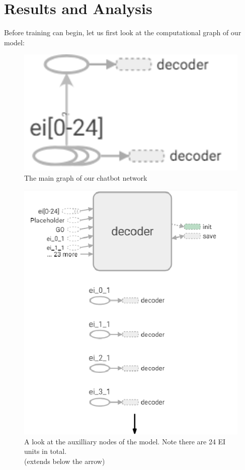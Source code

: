 \documentclass[titlepage]{article}
\begin{document}
\section{Results and Analysis}
Before training can begin, let us first look at the computational graph of our model:
\begin{figure}[H]
	\centering
	\includegraphics[width=120mm]{main_graph.png}
	\caption{The main graph of our chatbot network}
	\label{fig:maingraph}
\end{figure}
\begin{figure}[H]
	\centering
	\includegraphics[width=120mm]{aux_nodes.png}
	\caption{A look at the auxilliary nodes of the model. Note there are 24 EI units in total.\\(extends below the arrow)}
	\label{fig:auxnodes}
\end{figure}
\end{document}
